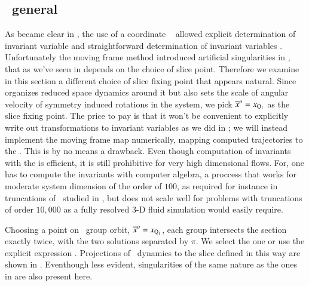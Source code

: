 
\subsection{\label{s:mfReqb}\CLe\  general \slice}

As became clear in , the use of a coordinate \slice\ 
allowed explicit determination of invariant variable  and straightforward
determination of invariant variables . Unfortunately the moving frame
method introduced artificial singularities in \reducedsp, that as we've seen in 
depends on the choice of slice point.
Therefore we examine in this section a different choice of slice fixing point that appears natural.
Since  organizes reduced space dynamics around it but also sets the
scale of angular velocity of symmetry induced rotations in the system, we
pick ${\overline{x}^o}=x_{\mathrm{Q}_{1}}$ as the slice fixing point.
The price to pay is that it won't be convenient to explicitly write out
transformations to invariant variables
as we did in ; we will instead implement the moving frame map numerically,
mapping computed trajectories to the \slice.
This is by no means a drawback. Even though computation of invariants with the
{\mframes} is efficient, it is still
prohibitive for very high dimensional flows. For, one has
to compute the invariants with computer algebra, a proccess
that works for moderate system dimension of the order of $100$,
as required for instance in truncations of \KSe\ studied in ,
but does not scale well for problems with truncations of order $10,000$ as
a fully resolved $3$-D fluid simulation would easily require.


Choosing a point on \reqv\ group orbit,
${\overline{x}^o}  = x_{\mathrm{Q}_{1}}$,
each group intersects the section exactly twice,  with the
two solutions separated by $\pi$. We select the one 
 or use
the explicit expression .
Projections of \cLe\ dynamics to the slice defined in this way are
shown in \reffig{fig:CLEmfReqb1}. Eventhough less evident, singularities
of the same nature as the ones in \refsect{s:cLeCoordMF} are also present
here.


